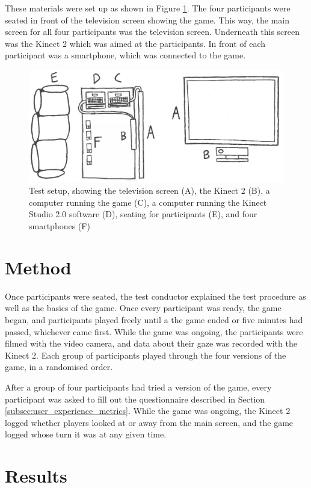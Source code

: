 These materials were set up as shown in Figure \ref{fig:test_setup}. The four participants were seated in front of the television screen showing the game. This way, the main screen for all four participants was the television screen. Underneath this screen was the Kinect 2 which was aimed at the participants. In front of each participant was a smartphone, which was connected to the game.

\begin{figure}[h!]
	\centering
	\includegraphics[width=\textwidth]{figures/test_setup.png}
	\caption{Test setup, showing the television screen (A), the Kinect 2 (B), a computer running the game (C), a computer running the Kinect Studio 2.0 software (D), seating for participants (E), and four smartphones (F)}\label{fig:test_setup}
\end{figure}

\section{Method}
Once participants were seated, the test conductor explained the test procedure as well as the basics of the game. Once every participant was ready, the game began, and participants played freely until a the game ended or five minutes had passed, whichever came first. While the game was ongoing, the participants were filmed with the video camera, and data about their gaze was recorded with the Kinect 2. Each group of participants played through the four versions of the game, in a randomised order.

After a group of four participants had tried a version of the game, every participant was asked to fill out the questionnaire described in Section \ref{subsec:user_experience_metrics}. While the game was ongoing, the Kinect 2 logged whether players looked at or away from the main screen, and the game logged whose turn it was at any given time.

\section{Results}
